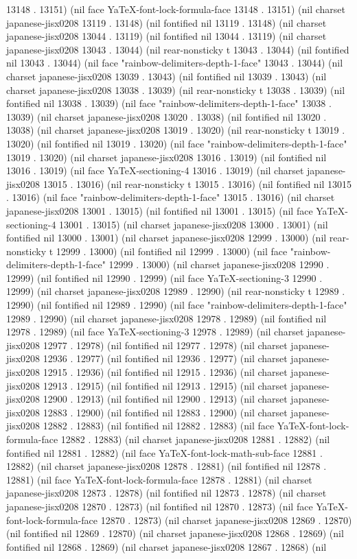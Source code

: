 13148 . 13151) (nil face YaTeX-font-lock-formula-face 13148 . 13151) (nil charset japanese-jisx0208 13119 . 13148) (nil fontified nil 13119 . 13148) (nil charset japanese-jisx0208 13044 . 13119) (nil fontified nil 13044 . 13119) (nil charset japanese-jisx0208 13043 . 13044) (nil rear-nonsticky t 13043 . 13044) (nil fontified nil 13043 . 13044) (nil face "rainbow-delimiters-depth-1-face" 13043 . 13044) (nil charset japanese-jisx0208 13039 . 13043) (nil fontified nil 13039 . 13043) (nil charset japanese-jisx0208 13038 . 13039) (nil rear-nonsticky t 13038 . 13039) (nil fontified nil 13038 . 13039) (nil face "rainbow-delimiters-depth-1-face" 13038 . 13039) (nil charset japanese-jisx0208 13020 . 13038) (nil fontified nil 13020 . 13038) (nil charset japanese-jisx0208 13019 . 13020) (nil rear-nonsticky t 13019 . 13020) (nil fontified nil 13019 . 13020) (nil face "rainbow-delimiters-depth-1-face" 13019 . 13020) (nil charset japanese-jisx0208 13016 . 13019) (nil fontified nil 13016 . 13019) (nil face YaTeX-sectioning-4 13016 . 13019) (nil charset japanese-jisx0208 13015 . 13016) (nil rear-nonsticky t 13015 . 13016) (nil fontified nil 13015 . 13016) (nil face "rainbow-delimiters-depth-1-face" 13015 . 13016) (nil charset japanese-jisx0208 13001 . 13015) (nil fontified nil 13001 . 13015) (nil face YaTeX-sectioning-4 13001 . 13015) (nil charset japanese-jisx0208 13000 . 13001) (nil fontified nil 13000 . 13001) (nil charset japanese-jisx0208 12999 . 13000) (nil rear-nonsticky t 12999 . 13000) (nil fontified nil 12999 . 13000) (nil face "rainbow-delimiters-depth-1-face" 12999 . 13000) (nil charset japanese-jisx0208 12990 . 12999) (nil fontified nil 12990 . 12999) (nil face YaTeX-sectioning-3 12990 . 12999) (nil charset japanese-jisx0208 12989 . 12990) (nil rear-nonsticky t 12989 . 12990) (nil fontified nil 12989 . 12990) (nil face "rainbow-delimiters-depth-1-face" 12989 . 12990) (nil charset japanese-jisx0208 12978 . 12989) (nil fontified nil 12978 . 12989) (nil face YaTeX-sectioning-3 12978 . 12989) (nil charset japanese-jisx0208 12977 . 12978) (nil fontified nil 12977 . 12978) (nil charset japanese-jisx0208 12936 . 12977) (nil fontified nil 12936 . 12977) (nil charset japanese-jisx0208 12915 . 12936) (nil fontified nil 12915 . 12936) (nil charset japanese-jisx0208 12913 . 12915) (nil fontified nil 12913 . 12915) (nil charset japanese-jisx0208 12900 . 12913) (nil fontified nil 12900 . 12913) (nil charset japanese-jisx0208 12883 . 12900) (nil fontified nil 12883 . 12900) (nil charset japanese-jisx0208 12882 . 12883) (nil fontified nil 12882 . 12883) (nil face YaTeX-font-lock-formula-face 12882 . 12883) (nil charset japanese-jisx0208 12881 . 12882) (nil fontified nil 12881 . 12882) (nil face YaTeX-font-lock-math-sub-face 12881 . 12882) (nil charset japanese-jisx0208 12878 . 12881) (nil fontified nil 12878 . 12881) (nil face YaTeX-font-lock-formula-face 12878 . 12881) (nil charset japanese-jisx0208 12873 . 12878) (nil fontified nil 12873 . 12878) (nil charset japanese-jisx0208 12870 . 12873) (nil fontified nil 12870 . 12873) (nil face YaTeX-font-lock-formula-face 12870 . 12873) (nil charset japanese-jisx0208 12869 . 12870) (nil fontified nil 12869 . 12870) (nil charset japanese-jisx0208 12868 . 12869) (nil fontified nil 12868 . 12869) (nil charset japanese-jisx0208 12867 . 12868) (nil 